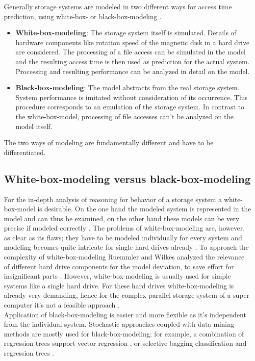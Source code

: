 \documentclass{superfri}
\begin{document}
Generally storage systems are modeled in two different ways for access time prediction, using white-box- or black-box-modeling \cite{Crume:2013:FML:2538542.2538561}.
\begin{itemize}
	\item \textbf{White-box-modeling}: The storage system itself is simulated. Details of hardware components like rotation speed of the magnetic disk in a hard drive are considered. The processing of a file access can be simulated in the model and the resulting access time is then used as prediction for the actual system.
	Processing and resulting performance can be analyzed in detail on the model.
	\item \textbf{Black-box-modeling}: The model abstracts from the real storage system. 
	System performance is imitated without consideration of its occurrence. %
	This procedure corresponds to an emulation of the storage system.
	In contrast to the white-box-model, processing of file accesses can't be analyzed on the model itself.
\end{itemize}
The two ways of modeling are fundamentally different and have to be differentiated.

\subsection{White-box-modeling versus black-box-modeling}
For the in-depth analysis of reasoning for behavior of a storage system a white-box-model is desirable.
On the one hand the modeled system is represented in the model and can thus be examined, on the other hand these models can be very precise if modeled correctly \cite{Ruemmler94anintroduction}.
The problems of white-box-modeling are, however, as clear as its flaws; they have to be modeled individually for every system and modeling becomes quite intricate for single hard drives already \cite{Crume:2013:FML:2538542.2538561}.
To approach the complexity of white-box-modeling Ruemmler and Wilkes analyzed the relevance of different hard drive components for the model deviation, to save effort for insignificant parts \cite{Ruemmler94anintroduction}.
However, white-box-modeling is usually used for simple systems like a single hard drive. For these hard drives white-box-modeling is already very demanding, hence for the complex parallel storage system of a super computer it's not a feasible approach \cite{DBLP:conf/npc/ZhangLZJC10}.\\

Application of black-box-modeling is easier and more flexible as it's independent from the individual system.
Stochastic approaches coupled with data mining methods are mostly used for black-box-modeling; for example, a combination of regression trees support vector regression \cite{Dai:2012:SDP:2477169.2477214}, or selective bagging classification and regression trees \cite{DBLP:conf/npc/ZhangLZJC10}.
\end{document}
